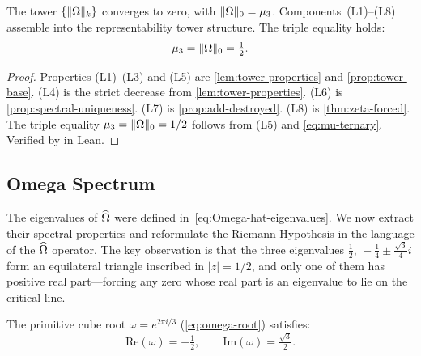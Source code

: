 \begin{theorem}\label{thm:cat-limit}
The tower $\{\|\Omega\|_k\}$ converges to zero, with $\|\Omega\|_0 =
\mu_3$. Components~(L1)--(L8) assemble into the representability tower
structure. The triple equality holds:
\begin{equation}\label{eq:triple-equality}
  \mu_3 = \|\Omega\|_0 = \tfrac{1}{2}.
\end{equation}
\end{theorem}

\begin{proof}
Properties (L1)--(L3) and (L5) are \cref{lem:tower-properties}
and \cref{prop:tower-base}.  (L4) is the strict decrease from
\cref{lem:tower-properties}.  (L6) is
\cref{prop:spectral-uniqueness}.  (L7) is
\cref{prop:add-destroyed}.  (L8) is
\cref{thm:zeta-forced}.  The triple equality
$\mu_3 = \|\Omega\|_0 = 1/2$ follows from (L5) and
\cref{eq:mu-ternary}.
Verified by  in Lean.
\end{proof}



\subsection{Omega Spectrum}\label{ssec:omega-spectrum}

The eigenvalues of $\widehat{\Omega}$ were defined in~\cref{eq:Omega-hat-eigenvalues}.
We now extract their spectral properties and reformulate the Riemann
Hypothesis in the language of the $\widehat{\Omega}$ operator.  The key observation is
that the three eigenvalues $\tfrac{1}{2},\,-\tfrac{1}{4}\pm\tfrac{\sqrt{3}}{4}i$
form an equilateral triangle inscribed in $|z|=1/2$, and only one of them
has positive real part---forcing any zero whose real part is an eigenvalue to
lie on the critical line.

\begin{proposition}\label{prop:omega-properties}
The primitive cube root $\omega = e^{2\pi i/3}$
(\cref{eq:omega-root}) satisfies:
\begin{equation}\label{eq:omega-re-im}
  \mathrm{Re}(\omega) = -\tfrac{1}{2}, \qquad
  \mathrm{Im}(\omega) = \tfrac{\sqrt{3}}{2}.
\end{equation}
\end{proposition}

